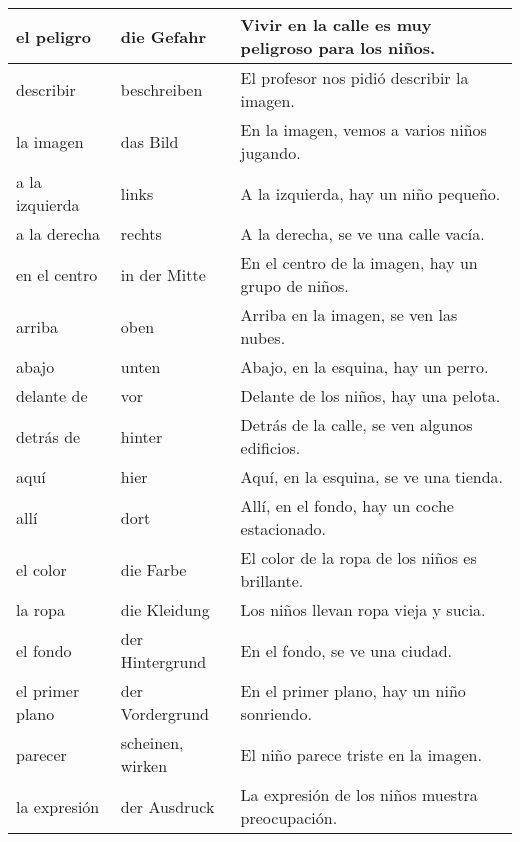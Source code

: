 \documentclass{article}
\begin{document}
\begin{table}
\begin{tabular}{| m{4cm} | m{4cm} | m{6cm} |}
\hline
el peligro & die Gefahr & Vivir en la calle es muy peligroso para los niños. \\
\hline
describir & beschreiben & El profesor nos pidió describir la imagen. \\
\hline
la imagen & das Bild & En la imagen, vemos a varios niños jugando. \\
\hline
a la izquierda & links & A la izquierda, hay un niño pequeño. \\
\hline
a la derecha & rechts & A la derecha, se ve una calle vacía. \\
\hline
en el centro & in der Mitte & En el centro de la imagen, hay un grupo de niños. \\
\hline
arriba & oben & Arriba en la imagen, se ven las nubes. \\
\hline
abajo & unten & Abajo, en la esquina, hay un perro. \\
\hline
delante de & vor & Delante de los niños, hay una pelota. \\
\hline
detrás de & hinter & Detrás de la calle, se ven algunos edificios. \\
\hline
aquí & hier & Aquí, en la esquina, se ve una tienda. \\
\hline
allí & dort & Allí, en el fondo, hay un coche estacionado. \\
\hline
el color & die Farbe & El color de la ropa de los niños es brillante. \\
\hline
la ropa & die Kleidung & Los niños llevan ropa vieja y sucia. \\
\hline
el fondo & der Hintergrund & En el fondo, se ve una ciudad. \\
\hline
el primer plano & der Vordergrund & En el primer plano, hay un niño sonriendo. \\
\hline
parecer & scheinen, wirken & El niño parece triste en la imagen. \\
\hline
la expresión & der Ausdruck & La expresión de los niños muestra preocupación. \\
\hline
\end{tabular}
\end{table}
\end{document}
